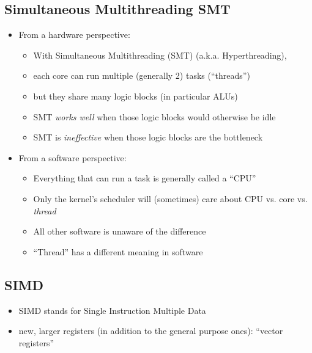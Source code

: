 \documentclass[12pt]{article}
\begin{document}
\subsection{Simultaneous Multithreading {SMT}}
    \begin{itemize}
        \item From a hardware perspective:
        \begin{itemize}
            \item With Simultaneous Multithreading (SMT) (a.k.a. Hyperthreading),
            \item each core can run multiple (generally 2) tasks (``threads'')
            \item but they share many logic blocks (in particular ALUs)
            \item SMT \textit{works well} when those logic blocks would otherwise be idle
            \item SMT is \textit{ineffective} when those logic blocks are the bottleneck
        \end{itemize}
        \item From a software perspective:
        \begin{itemize}
            \item Everything that can run a task is generally called a ``CPU''
            \item Only the kernel's scheduler will (sometimes) care about CPU vs. core vs. \textit{thread}
            \item All other software is unaware of the difference
            \item ``Thread'' has a different meaning in software
        \end{itemize}
    \end{itemize}

\subsection{SIMD}
\begin{itemize}
    \item SIMD stands for Single Instruction Multiple Data
    \item new, larger registers (in addition to the general purpose ones): ``vector registers''
\end{itemize}
\end{document}
